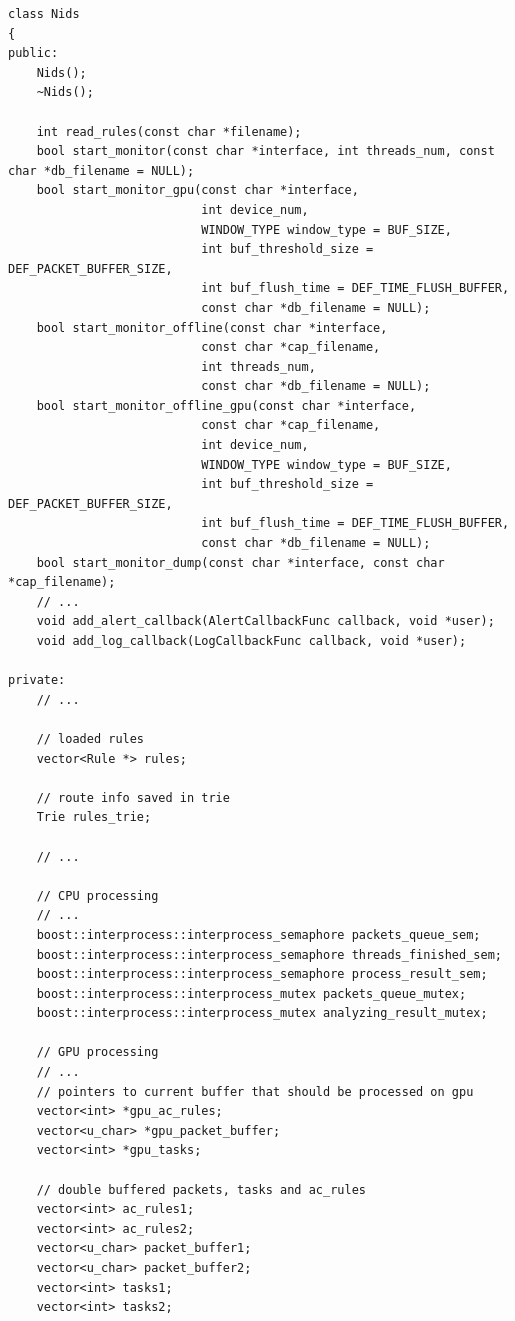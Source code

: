 \documentclass[thesis=M,english]{FITthesis}[2011/07/15]
\begin{document}
\begin{lstlisting}
class Nids
{
public:
    Nids();
    ~Nids();

    int read_rules(const char *filename);
    bool start_monitor(const char *interface, int threads_num, const char *db_filename = NULL);
    bool start_monitor_gpu(const char *interface,
                           int device_num,
                           WINDOW_TYPE window_type = BUF_SIZE,
                           int buf_threshold_size = DEF_PACKET_BUFFER_SIZE,
                           int buf_flush_time = DEF_TIME_FLUSH_BUFFER,
                           const char *db_filename = NULL);
    bool start_monitor_offline(const char *interface, 
                           const char *cap_filename, 
                           int threads_num, 
                           const char *db_filename = NULL);
    bool start_monitor_offline_gpu(const char *interface, 
                           const char *cap_filename, 
                           int device_num,
                           WINDOW_TYPE window_type = BUF_SIZE,
                           int buf_threshold_size = DEF_PACKET_BUFFER_SIZE,
                           int buf_flush_time = DEF_TIME_FLUSH_BUFFER,
                           const char *db_filename = NULL);
    bool start_monitor_dump(const char *interface, const char *cap_filename);
    // ...
    void add_alert_callback(AlertCallbackFunc callback, void *user);
    void add_log_callback(LogCallbackFunc callback, void *user);

private:
    // ...

    // loaded rules
    vector<Rule *> rules;

    // route info saved in trie
    Trie rules_trie;

    // ...

    // CPU processing
    // ...
    boost::interprocess::interprocess_semaphore packets_queue_sem;
    boost::interprocess::interprocess_semaphore threads_finished_sem;
    boost::interprocess::interprocess_semaphore process_result_sem;
    boost::interprocess::interprocess_mutex packets_queue_mutex;
    boost::interprocess::interprocess_mutex analyzing_result_mutex;

    // GPU processing
    // ...
    // pointers to current buffer that should be processed on gpu
    vector<int> *gpu_ac_rules;
    vector<u_char> *gpu_packet_buffer;
    vector<int> *gpu_tasks;

    // double buffered packets, tasks and ac_rules
    vector<int> ac_rules1;
    vector<int> ac_rules2;
    vector<u_char> packet_buffer1;
    vector<u_char> packet_buffer2;
    vector<int> tasks1;
    vector<int> tasks2;


\end{lstlisting}
\end{document}
